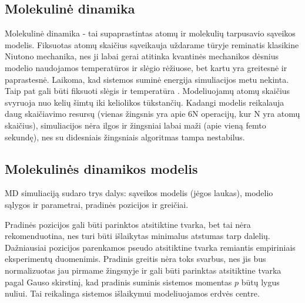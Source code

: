 \subsection{Molekulinė dinamika}
\label{sec:molecular_dynamics}


Molekulinė dinamika - tai supaprastintas atomų ir molekulių tarpusavio sąveikos modelis.
Fiksuotas atomų skaičius sąveikauja uždarame tūryje reminatis klasikine Niutono mechanika,
nes ji labai gerai atitinka kvantinės mechanikos dėsnius modelio naudojamos temperatūros ir slėgio rėžiuose,
bet kartu yra greitesnė ir paprastesnė.
Laikoma, kad sistemos suminė energija simuliacijos metu nekinta.
Taip pat gali būti fiksuoti slėgis ir temperatūra \cite{hitch}.
Modeliuojamų atomų skaičius svyruoja nuo kelių šimtų iki keliolikos tūkstančių.
Kadangi modelis reikalauja daug skaičiavimo resursų (vienas žingsnis yra apie 6N operacijų, kur N yra atomų skaičius),
simuliacijos nėra ilgos ir žingsniai labai maži (apie vieną femto sekundę), nes su didesniais žingsniais algoritmas tampa nestabilus.


\subsection{Molekulinės dinamikos modelis}
\label{sec:molecular_dynamics_model}


MD simuliaciją sudaro trys dalys: sąveikos modelis (jėgos laukas), modelio sąlygos ir parametrai, pradinės pozicijos ir greičiai.

Pradinės pozicijos gali būti parinktos atsitiktine tvarka, bet tai nėra rekomenduotina, nes turi būti išlaikytas minimalus atstumas tarp dalelių.
Dažniausiai pozicijos parenkamos pseudo atsitiktine tvarka remiantis empiriniais eksperimentų duomenimis.
Pradinis greitis nėra toks svarbus, nes jis bus normalizuotas jau pirmame žingsnyje ir gali būti parinktas atsitiktine tvarka pagal Gauso skirstinį,
kad pradinis suminis sistemos momentas \(p\) būtų lygus nuliui.
Tai reikalinga sistemos išlaikymui modeliuojamos erdvės centre.


